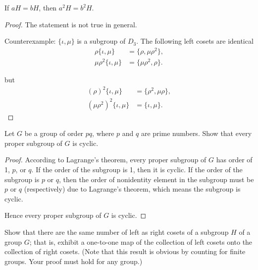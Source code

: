 \begin{exercise}
    If $aH = bH$, then $a^{2}H = b^{2}H$.
\end{exercise}

\begin{proof}
    The statement is not true in general.

    Counterexample: $\{ \iota, \mu \}$ is a subgroup of $D_{3}$. The following left cosets are identical
    \begin{align*}
        \rho\{ \iota, \mu \}        & = \{ \rho, \mu\rho^{2} \}, \\
        \mu\rho^{2}\{ \iota, \mu \} & = \{ \mu\rho^{2}, \rho \}.
    \end{align*}

    but
    \begin{align*}
        {(\rho)}^{2}\{ \iota, \mu \}        & = \{ \rho^{2}, \mu\rho \}, \\
        {(\mu\rho^{2})}^{2}\{ \iota, \mu \} & = \{ \iota, \mu \}.
    \end{align*}
\end{proof}

\begin{exercise}
    Let $G$ be a group of order $pq$, where $p$ and $q$ are prime numbers. Show that every proper subgroup of $G$ is cyclic.
\end{exercise}

\begin{proof}
    According to Lagrange's theorem, every proper subgroup of $G$ has order of 1, $p$, or $q$. If the order of the subgroup is 1, then it is cyclic. If the order of the subgroup is $p$ or $q$, then the order of nonidentity element in the subgroup must be $p$ or $q$ (respectively) due to Lagrange's theorem, which means the subgroup is cyclic.

    Hence every proper subgroup of $G$ is cyclic.
\end{proof}

\begin{exercise}
    Show that there are the same number of left as right cosets of a subgroup $H$ of a group $G$; that is, exhibit a one-to-one map of the collection of left cosets onto the collection of right cosets. (Note that this result is obvious by counting for finite groups. Your proof must hold for any group.)
\end{exercise}


